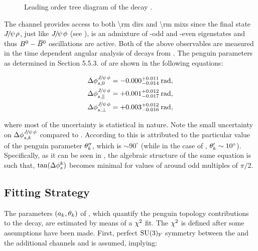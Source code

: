 \begin{figure}[h]
  \centering
  \scalebox{0.9}{\sffamily }
  \caption{Leading order tree diagram of the decay \BdJpsiRho.}
  \label{bs2jpsirho_diagram}
\end{figure}

The \BdJpsiRho channel provides access to both \Acp{\rm dir} and \Acp{\rm mix} since the final state
${J\mskip -3mu/\mskip -2mu\psi\mskip 2mu}\rho$, just like ${J\mskip -3mu/\mskip -2mu\psi\mskip 2mu}\phi$ (see ), is an admixture of \CP-odd and \CP-even
eigenstates and thus $B^0-\kern 0.18em\overline{\kern -0.18em B}{}^0$ oscillations are active. Both of the above observables are measured
in the time dependent angular analysis of \BdJpsipipi decays from \lhcb \cite{Aaij:2014vda}. The penguin
parameters as determined in Section 5.5.3. of \cite{DeBruyn-thesis} are shown in the following equations:

\begin{subequations}
  \label{delta_phis_jpsirho}
  \begin{align}
    \Delta\phi^{{J\mskip -3mu/\mskip -2mu\psi\mskip 2mu}\phi}_{s,{0}}         & = -0.000^{+0.011}_{-0.014}\:\text{rad},\\
    \Delta\phi^{{J\mskip -3mu/\mskip -2mu\psi\mskip 2mu}\phi}_{s,{\parallel}} & = +0.001^{+0.012}_{-0.017}\:\text{rad},\\
    \Delta\phi^{{J\mskip -3mu/\mskip -2mu\psi\mskip 2mu}\phi}_{s,{\perp}}     & = +0.003^{+0.012}_{-0.016}\:\text{rad},
  \end{align}
\end{subequations}

\noindent where most of the uncertainty is statistical in nature. Note the small uncertainty on
$\Delta\phi^{{J\mskip -3mu/\mskip -2mu\psi\mskip 2mu}\phi}_{s,{k}}$ compared to . According to \cite{DeBruyn:2014oga,DeBruyn-thesis}
this is attributed to the particular value of the penguin parameter $\theta_k''$, which is
$\sim 90^\circ$ (while in the case of \BsJpsiKst, $\theta_k' \sim 10^\circ$).
Specifically, as it can be seen in , the algebraic structure of the
same equation is such that, $\tan(\Delta\phi_{s}^k)$ becomes minimal for values of \thkPeng{}
around odd multiples of $\pi/2$.

\subsection{Fitting Strategy}
\label{penguin_chi2_fit}

The parameters $(a_k,\theta_k)$ of , which quantify the penguin topology contributions
to the \BsJpsiPhi decay, are estimated by means of a $\chi^2$ fit. The $\chi^2$ is defined after some assumptions have
been made. First, perfect $\mathrm{SU}(3)_{\rm F}$ symmetry between the \BsJpsiPhi and the additional channels \BsJpsiKst
and \BdJpsiRho is assumed, implying:

